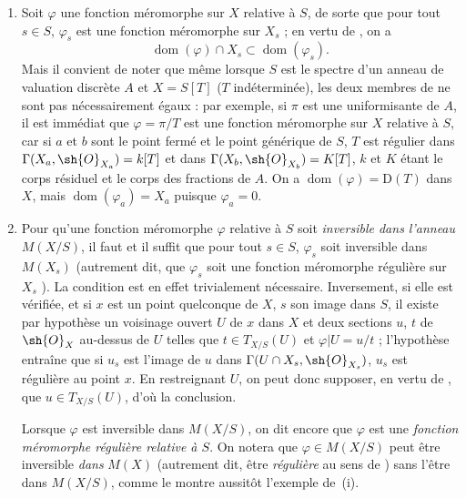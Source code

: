 \begin{remarks}[20.6.5]
\begin{enumerate}[label=(\roman*)]
  \item Soit $\varphi$ une fonction méromorphe sur $X$ relative à $S$, de sorte que pour tout $s\in S$, $\varphi_s$ est une fonction méromorphe sur $X_s$  ; en vertu de , on a
  \[
  \label{IV.20.6.5.1}
    \operatorname{dom}(\varphi)\cap X_s\subset\operatorname{dom}(\varphi_s).
    \tag{20.6.5.1}
  \]
  Mais il convient de noter que même lorsque $S$ est le spectre d'un anneau de valuation discrète $A$ et $X=S[T]$ ($T$ indéterminée), les deux membres de  ne sont pas nécessairement égaux : par exemple, si $\pi$ est une uniformisante de $A$, il est immédiat que $\varphi=\pi/T$ est une fonction méromorphe sur $X$ relative à $S$, car si $a$ et $b$ sont le point fermé et le point générique de $S$, $T$ est régulier dans $\Gamma(X_a,\sh{O}_{X_a})=k[T]$ et dans $\Gamma(X_b,\sh{O}_{X_b})=K[T]$, $k$ et $K$ étant le corps résiduel et le corps des fractions de $A$.
  On a $\operatorname{dom}(\varphi)=\mathrm{D}(T)$ dans $X$, mais $\operatorname{dom}(\varphi_a)=X_a$ puisque $\varphi_a=0$.

  \item Pour qu'une fonction méromorphe $\varphi$ relative à $S$ soit \emph{inversible dans l'anneau} $M(X/S)$, il faut et il suffit que pour tout $s\in S$, $\varphi_s$ soit inversible dans $M(X_s)$ (autrement dit, que $\varphi_s$ soit une fonction méromorphe régulière sur $X_s$ ).
  La condition est
  en effet trivialement nécessaire.
  Inversement, si elle est vérifiée, et si $x$ est un point quelconque de $X$, $s$ son image dans $S$, il existe par hypothèse un voisinage ouvert $U$ de $x$ dans $X$ et deux sections $u$, $t$ de $\sh{O}_X$ au-dessus de $U$ telles que $t\in T_{X/S}(U)$ et $\varphi|U=u/t$ ; l'hypothèse entraîne que si $u_s$ est l'image de $u$ dans $\Gamma(U\cap X_s,\sh{O}_{X_s})$, $u_s$ est régulière au point $x$.
  En restreignant $U$, on peut donc supposer, en vertu de , que $u\in T_{X/S}(U)$, d'où la conclusion.

  Lorsque $\varphi$ est inversible dans $M(X/S)$, on dit encore que $\varphi$ est une \emph{fonction méromorphe régulière relative à $S$}.
  On notera que $\varphi\in M(X/S)$ peut être inversible \emph{dans} $M(X)$ (autrement dit, être \emph{régulière} au sens de ) sans l'être dans $M(X/S)$, comme le montre aussitôt l'exemple de~(i).


\end{enumerate}
\end{remarks}
